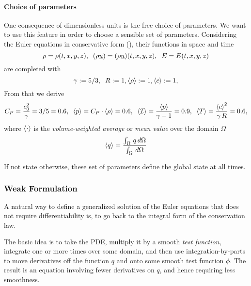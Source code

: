 \paragraph{Choice of parameters} One consequence of dimensionless units is the
free choice of parameters. We want to use this feature in order to choose a
sensible set of parameters.  Considering the Euler equations in conservative
form (), their functions in space and time
\begin{equation}
\rho = \rho(t,x,y,z), \;\;(\rho\underline{u}) = (\rho\underline{u})(t,x,y,z),\;\;E = E(t,x,y,z)
\end{equation}
are completed with
\begin{equation}
\label{eqn:parameter-choice-completion}
\gamma := 5/3,\;\;R := 1, \langle\rho\rangle := 1,\langle c\rangle := 1,
\end{equation}
From that we derive
\begin{equation}
C_P = \frac{c_0^2}{\gamma} = 3/5 = 0.6,\;\;
\langle p\rangle = C_P\cdot\langle\rho\rangle = 0.6,\;\;
\langle\mathcal{I}\rangle = \frac{\langle p\rangle}{\gamma -1} = 0.9,\;\;
\langle T\rangle = \frac{\left\langle c\right\rangle^2}{\gamma\,R} = 0.6,
\end{equation}
where $\left\langle\cdot\right\rangle$ is the \emph{volume-weighted average} or \emph{mean value}
over the domain $\Omega$
\begin{equation}
\label{eqn:domain-average}
    \left\langle q\right\rangle = \frac{\int_\Omega\,q\,d\Omega}{\int_\Omega\,d\Omega}
\end{equation}

If not state otherwise, these set of parameters define the global state at all times.

\subsubsection{Weak Formulation}
A natural way to define a generalized solution of the Euler equations that does
not require differentiability is, to go back to the integral form of the
conservation law.

The basic idea is to take the PDE, multiply it by a smooth \emph{test
function}, integrate one or more times over some domain, and then use
integration-by-parts to move derivatives off the function $q$ and onto some
smooth test function $\phi$. The result is an equation involving fewer
derivatives on $q$, and hence requiring less smoothness.

